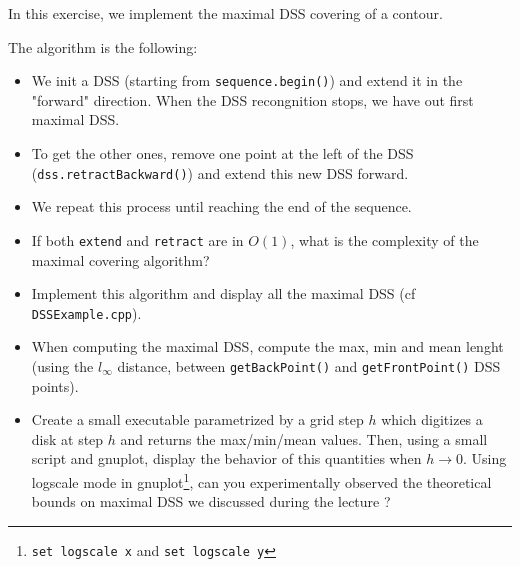 \documentclass[a4paper, 11pt]{article}
\begin{document}
\par In this exercise, we implement the maximal DSS covering of a contour.

\par The algorithm is the following:
	\begin{itemize}
	\item We init a DSS (starting from \texttt{sequence.begin()}) and extend it in the "forward" direction. When the DSS recongnition stops, we have out first maximal DSS.
	\item To get the other ones, remove one point at the left of the DSS (\texttt{dss.retractBackward()}) and extend this new DSS forward.
	\item We repeat this process until reaching the end of the sequence.
	\end{itemize}
	

\begin{itemize}
	\item If both \texttt{extend} and \texttt{retract} are in $O(1)$, what is the complexity of the maximal covering algorithm?
	
	\item Implement this algorithm and display all the maximal DSS (cf \texttt{DSSExample.cpp}).
	
	\item When computing the maximal DSS, compute the max, min and mean lenght (using the $l_\infty$ distance, between \texttt{getBackPoint()} and \texttt{getFrontPoint()} DSS points).
	
	\item Create a small executable parametrized by a grid step $h$ which digitizes a disk at step $h$ and returns the max/min/mean values.
Then, using a small script and gnuplot, display the behavior of this quantities when $h \rightarrow 0$. Using logscale mode in gnuplot\footnote{\texttt{set logscale x} and \texttt{set logscale y}}, can you experimentally observed the theoretical bounds on maximal DSS we discussed during the lecture ?
\end{itemize}
\end{document}
